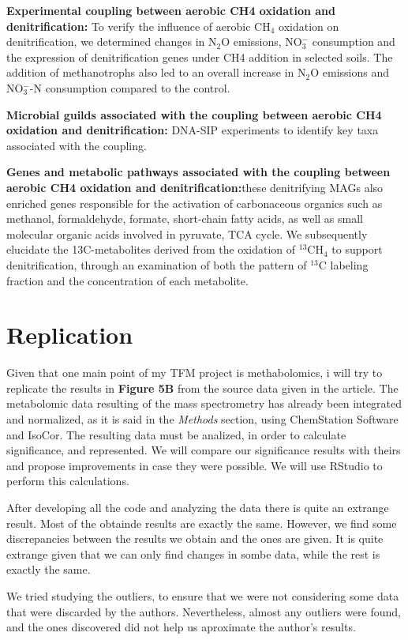 \documentclass{article}
\begin{document}
\textbf{Experimental coupling between aerobic CH4 oxidation and denitriﬁcation:}
To verify the inﬂuence of aerobic CH$_4$ oxidation on denitriﬁcation, we determined changes in N$_2$O emissions, NO$_3^-$ consumption and the expression of denitriﬁcation genes under CH4 addition in selected soils. The addition of methanotrophs also led to an overall increase in
N$_2$O emissions and NO$_3^-$-N consumption compared to the control.

\textbf{Microbial guilds associated with the coupling between aerobic CH4 oxidation and denitriﬁcation:} DNA-SIP experiments to identify key taxa associated with the coupling.

\textbf{Genes and metabolic pathways associated with the coupling between aerobic CH4 oxidation and denitriﬁcation:}these denitrifying MAGs also enriched genes responsible for the activation of carbonaceous organics such as methanol, formaldehyde, formate, short-chain fatty acids, as well as small molecular organic acids involved in pyruvate, TCA cycle. We subsequently elucidate the 13C-metabolites derived from the oxidation of $^{13}$CH$_4$ to support denitriﬁcation, through an examination of both the pattern of $^{13}$C labeling fraction and the concentration of each metabolite.

\section{Replication}

Given that one main point of my TFM project is methabolomics, i will try to replicate the results in \textbf{Figure 5B} from the source data given in the article. The metabolomic data resulting of the mass spectrometry has already been integrated and normalized, as it is said in the \textit{Methods} section, using ChemStation Software and IsoCor. The resulting data must be analized, in order to calculate significance, and represented. We will compare our significance results with theirs and propose improvements in case they were possible. We will use RStudio to perform this calculations.

After developing all the code and analyzing the data there is quite an extrange result. Most of the obtainde results are exactly the same. However, we find some discrepancies between the results we obtain and the ones are given. It is quite extrange given that we can only find changes in sombe data, while the rest is exactly the same.

We tried studying the outliers, to ensure that we were not considering some data that were discarded by the authors. Nevertheless, almost any outliers were found, and the ones discovered did not help us aproximate the author's results.
\end{document}
